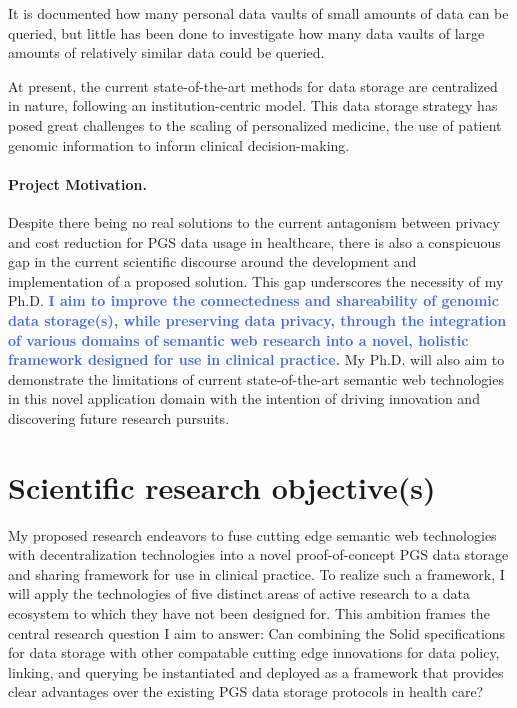\documentclass[a4paper,11pt]{article}
\makeatletter
\renewcommand{\strong}[1]{\@strong{#1}}
\newcommand{\strong}[1]{\@strong{#1}}
\newcommand{\@@strong}[1]{\textbf{\let\@strong\@@@strong#1}}
\newcommand{\@@@strong}[1]{\textnormal{\let\@strong\@@strong#1}}
\let\@strong\@@strong
\newcommand{\contribution}[1]{\strong{\textcolor{RoyalBlue}{#1}}} %
\makeatother
\begin{document}
\begin{refsection}
It is documented how many personal data vaults of small amounts of data can be queried, but little has been done to investigate how many data vaults of large amounts of relatively similar data could be queried.

At present, the current state-of-the-art methods for data storage are centralized in nature, following an institution-centric model. 
This data storage strategy has posed great challenges to the scaling of personalized medicine, the use of patient genomic information to inform clinical decision-making.


\paragraph{Project Motivation.}
Despite there being no real solutions to the current antagonism between privacy and cost reduction for PGS data usage in healthcare, there is also a conspicuous gap in the current scientific discourse around the development and implementation of a proposed solution. 
This gap underscores the necessity of my Ph.D.
\contribution{I aim to improve the connectedness and shareability of genomic data storage(s), while preserving data privacy, through the integration of various domains of semantic web research into a novel, holistic framework designed for use in clinical practice.}
My Ph.D. will also aim to demonstrate the limitations of current state-of-the-art semantic web technologies in this novel application domain with the intention of driving innovation and discovering future research pursuits.



\section{Scientific research objective(s)}

\begin{comment}
Describe explicitly the scientific objective(s) and the research hypothesis. 
Explain whether and how the research is specifically challenging and inventive, describing in particular the innovative aspects of the envisaged results. 
Discuss in detail the results (or partial results) that you aim to achieve, such as specific knowledge, the solution to particular problems and academic breakthroughs.
\end{comment}
\smallskip

\noindent
My proposed research endeavors to fuse cutting edge semantic web technologies with decentralization technologies into a novel proof-of-concept PGS data storage and sharing framework for use in clinical practice. 
To realize such a framework, I will apply the technologies of five distinct areas of active research to a data ecosystem to which they have not been designed for.
This ambition frames the central research question I aim to answer: Can combining the Solid specifications for data storage with other compatable cutting edge innovations for data policy, linking, and querying be instantiated and deployed as a framework that provides clear advantages over the existing PGS data storage protocols in health care?


\end{refsection}
\end{document}
